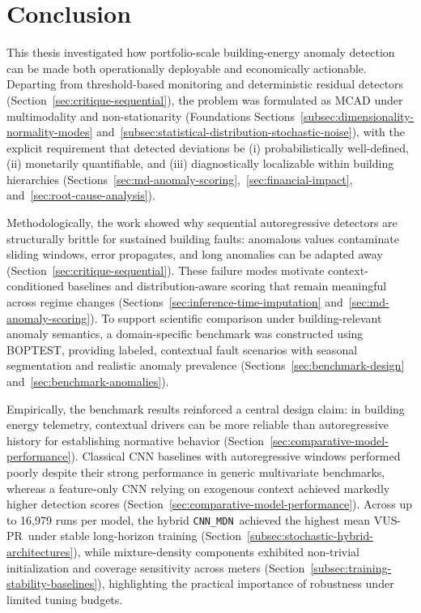 \chapter{Conclusion}\label{chap:conclusion}
This thesis investigated how portfolio-scale building-energy anomaly detection can be
made both operationally deployable and economically actionable. Departing from
threshold-based monitoring and deterministic residual detectors (Section~\ref{sec:critique-sequential}),
the problem was formulated as \ac{MCAD} under multimodality and non-stationarity
(Foundations Sections~\ref{subsec:dimensionality-normality-modes}
and~\ref{subsec:statistical-distribution-stochastic-noise}), with the explicit requirement
that detected deviations be (i) probabilistically well-defined, (ii) monetarily
quantifiable, and (iii) diagnostically localizable within building hierarchies
(Sections~\ref{sec:md-anomaly-scoring},~\ref{sec:financial-impact}, and~\ref{sec:root-cause-analysis}).

Methodologically, the work showed why sequential autoregressive detectors are
structurally brittle for sustained building faults: anomalous values contaminate
sliding windows, error propagates, and long anomalies can be adapted away
(Section~\ref{sec:critique-sequential}). These failure modes motivate
context-conditioned baselines and distribution-aware scoring that remain meaningful
across regime changes (Sections~\ref{sec:inference-time-imputation}
and~\ref{sec:md-anomaly-scoring}).
To support scientific comparison under building-relevant anomaly semantics, a
domain-specific benchmark was constructed using \ac{BOPTEST}, providing labeled,
contextual fault scenarios with seasonal segmentation and realistic anomaly
prevalence (Sections~\ref{sec:benchmark-design} and~\ref{sec:benchmark-anomalies}).

Empirically, the benchmark results reinforced a central design claim: in building
energy telemetry, contextual drivers can be more reliable than autoregressive
history for establishing normative behavior (Section~\ref{sec:comparative-model-performance}).
Classical \ac{CNN} baselines with autoregressive windows performed poorly despite their
strong performance in generic multivariate benchmarks, whereas a feature-only \ac{CNN}
relying on exogenous context achieved markedly higher detection scores
(Section~\ref{sec:comparative-model-performance}). Across up to 16{,}979 runs per model,
the hybrid \texttt{CNN\_\allowbreak{}MDN}~achieved the highest mean \ac{VUS-PR}~under stable
long-horizon training (Section~\ref{subsec:stochastic-hybrid-architectures}), while
mixture-density components exhibited non-trivial initialization and coverage sensitivity
across meters (Section~\ref{subsec:training-stability-baselines}), highlighting the
practical importance of robustness under limited tuning budgets.

